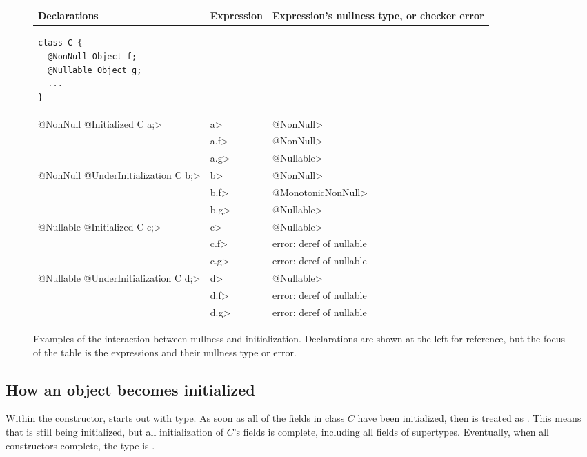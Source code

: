 \begin{figure}
\begin{tabular}{l|l|l}
Declarations & Expression & Expression's nullness type, or checker error \\ \hline
\begin{minipage}{1.5in}
\begin{Verbatim}
class C {
  @NonNull Object f;
  @Nullable Object g;
  ...
}
\end{Verbatim}
\end{minipage} & & \\ \cline{2-3}
\<@NonNull @Initialized C a;>
& \<a> & \<@NonNull> \\
& \<a.f> & \<@NonNull> \\
& \<a.g> & \<@Nullable> \\ \cline{2-3}
\<@NonNull @UnderInitialization C b;>
& \<b> & \<@NonNull> \\
& \<b.f> & \<@MonotonicNonNull> \\
& \<b.g> & \<@Nullable> \\ \cline{2-3}
\<@Nullable @Initialized C c;>
& \<c> & \<@Nullable> \\
& \<c.f> & error: deref of nullable \\
& \<c.g> & error: deref of nullable \\ \cline{2-3}
\<@Nullable @UnderInitialization C d;>
& \<d> & \<@Nullable> \\
& \<d.f> & error: deref of nullable \\
& \<d.g> & error: deref of nullable \\
\end{tabular}
\caption{Examples of the interaction between nullness and initialization.
  Declarations are shown at the left for reference, but the focus of the
  table is the expressions and their nullness type or error.}
\label{fig-initialization-examples}
\end{figure}




\subsection{How an object becomes initialized\label{becoming-initialized}}

Within the constructor,
 starts out with  type.
As soon as all of the  fields
in class $C$ have been initialized, then  is treated as
.
This means that  is still being initialized, but all
initialization of $C$'s fields is complete, including all fields of supertypes.
Eventually, when all constructors complete, the type is
.

